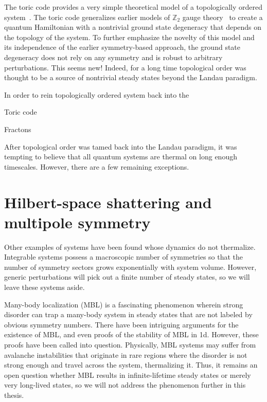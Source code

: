The toric code provides a very simple theoretical model of a topologically ordered system~\cite{Kitaev2003Fault}. The toric code generalizes earlier models of $\mathbb{Z}_2$ gauge theory~\cite{Wegner1971Duality} to create a quantum Hamiltonian with a nontrivial ground state degeneracy that depends on the topology of the system. To further emphasize the novelty of this model and its independence of the earlier symmetry-based approach, the ground state degeneracy does not rely on any symmetry and is robust to arbitrary perturbations. This seems new! Indeed, for a long time topological order was thought to be a source of nontrivial steady states beyond the Landau paradigm.

In order to rein topologically ordered system back into the 

Toric code

Fractons





After topological order was tamed back into the Landau paradigm, it was tempting to believe that all quantum systems are thermal on long enough timescales. However, there are a few remaining exceptions.

\section{Hilbert-space shattering and multipole symmetry}

Other examples of systems have been found whose dynamics do not thermalize. Integrable systems possess a macroscopic number of symmetries so that the number of symmetry sectors grows exponentially with system volume. However, generic perturbations will pick out a finite number of steady states, so we will leave these systems aside.

Many-body localization (MBL) is a fascinating phenomenon wherein strong disorder can trap a many-body system in steady states that are not labeled by obvious symmetry numbers. There have been intriguing arguments for the existence of MBL, and even proofs of the stability of MBL in 1d. However, these proofs have been called into question. Physically, MBL systems may suffer from avalanche instabilities that originate in rare regions where the disorder is not strong enough and travel across the system, thermalizing it. Thus, it remains an open question whether MBL results in infinite-lifetime steady states or merely very long-lived states, so we will not address the phenomenon further in this thesis. 


